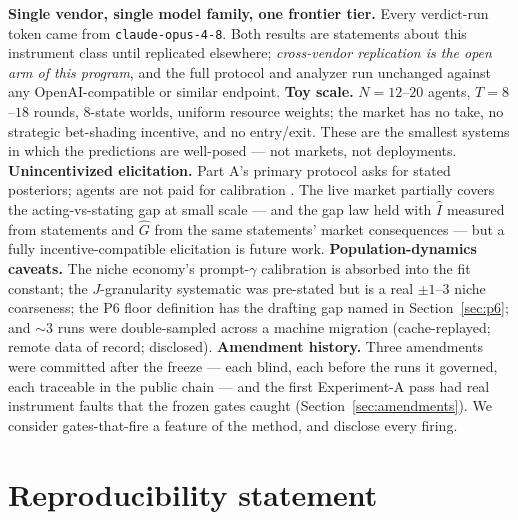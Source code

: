\documentclass{article} %
\newcommand{\Ihat}{\hat{I}}
\newcommand{\Ghat}{\hat{G}}
\begin{document}
\textbf{Single vendor, single model family, one frontier tier.} Every verdict-run token came from \texttt{claude-opus-4-8}. Both results are statements about this instrument class until replicated elsewhere; \emph{cross-vendor replication is the open arm of this program}, and the full protocol and analyzer run unchanged against any OpenAI-compatible or similar endpoint. \textbf{Toy scale.} $N = 12$--$20$ agents, $T = 8$--$18$ rounds, 8-state worlds, uniform resource weights; the market has no take, no strategic bet-shading incentive, and no entry/exit. These are the smallest systems in which the predictions are well-posed --- not markets, not deployments. \textbf{Unincentivized elicitation.} Part A's primary protocol asks for stated posteriors; agents are not paid for calibration \citep{gneiting2007}. The live market partially covers the acting-vs-stating gap at small scale --- and the gap law held with $\Ihat$ measured from statements and $\Ghat$ from the same statements' market consequences --- but a fully incentive-compatible elicitation is future work. \textbf{Population-dynamics caveats.} The niche economy's prompt-$\gamma$ calibration is absorbed into the fit constant; the $J$-granularity systematic was pre-stated but is a real $\pm1$--$3$ niche coarseness; the P6 floor definition has the drafting gap named in Section~\ref{sec:p6}; and $\sim$3 runs were double-sampled across a machine migration (cache-replayed; remote data of record; disclosed). \textbf{Amendment history.} Three amendments were committed after the freeze --- each blind, each before the runs it governed, each traceable in the public chain --- and the first Experiment-A pass had real instrument faults that the frozen gates caught (Section~\ref{sec:amendments}). We consider gates-that-fire a feature of the method, and disclose every firing.

\section{Reproducibility statement}
\label{sec:repro}
\end{document}
